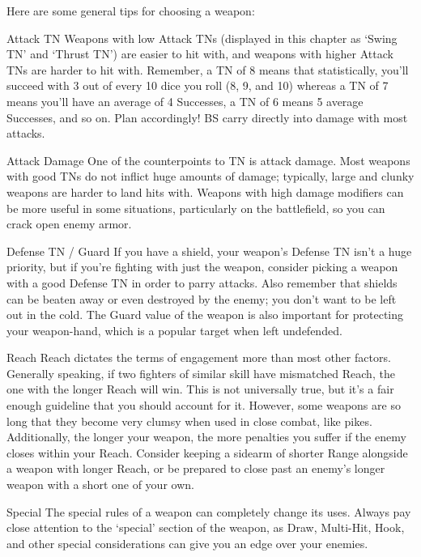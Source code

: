 \documentclass[oneside,11pt,english]{book}
\begin{document}
 

Here are some general tips for choosing a weapon: 

 

Attack TN 
Weapons with low Attack TNs (displayed in this chapter as ‘Swing TN’ and ‘Thrust TN’) are easier to hit 
with, and weapons with higher Attack TNs are harder to hit with. Remember, a TN of 8 means that 
statistically, you’ll succeed with 3 out of every 10 dice you roll (8, 9, and 10) whereas a TN of 7 means 
you’ll have an average of 4 Successes, a TN of 6 means 5 average Successes, and so on. Plan 
accordingly! BS carry directly into damage with most attacks. 

 

Attack Damage 
One of the counterpoints to TN is attack damage. Most weapons with good TNs do not inflict huge 
amounts of damage; typically, large and clunky weapons are harder to land hits with. Weapons with high 
damage modifiers can be more useful in some situations, particularly on the battlefield, so you can crack 
open enemy armor. 

 

Defense TN / Guard 
If you have a shield, your weapon’s Defense TN isn’t a huge priority, but if you’re fighting with just the 
weapon, consider picking a weapon with a good Defense TN in order to parry attacks. Also remember 
that shields can be beaten away or even destroyed by the enemy; you don’t want to be left out in the cold. 
The Guard value of the weapon is also important for protecting your weapon-hand, which is a popular 
target when left undefended. 

 

Reach 
Reach dictates the terms of engagement more than most other factors. Generally speaking, if two fighters 
of similar skill have mismatched Reach, the one with the longer Reach will win. This is not universally 
true, but it’s a fair enough guideline that you should account for it. However, some weapons are so long 
that they become very clumsy when used in close combat, like pikes. Additionally, the longer your 
weapon, the more penalties you suffer if the enemy closes within your Reach. Consider keeping a sidearm 
of shorter Range alongside a weapon with longer Reach, or be prepared to close past an enemy’s longer 
weapon with a short one of your own. 

 

Special 
The special rules of a weapon can completely change its uses. Always pay close attention to the ‘special’ 
section of the weapon, as Draw, Multi-Hit, Hook, and other special considerations can give you an edge 
over your enemies. 
\end{document}
